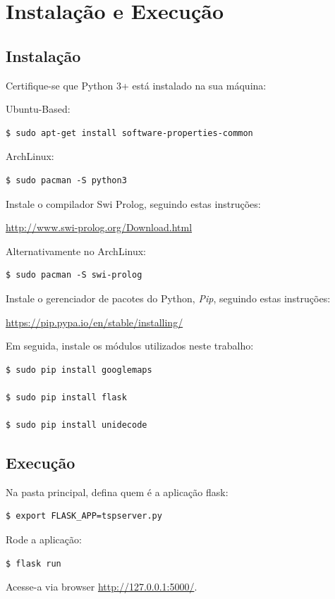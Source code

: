 \documentclass[12pt,a4paper]{article}
\begin{document}
\section{Instalação e Execução}
\subsection{Instalação}
Certifique-se que Python 3+ está instalado na sua máquina:

Ubuntu-Based:
\begin{verbatim}
$ sudo apt-get install software-properties-common 
\end{verbatim}

ArchLinux:
\begin{verbatim}
$ sudo pacman -S python3
\end{verbatim}

Instale o compilador Swi Prolog, seguindo estas instruções:

\url{http://www.swi-prolog.org/Download.html}

Alternativamente no ArchLinux:
\begin{verbatim}
$ sudo pacman -S swi-prolog
\end{verbatim}

Instale o gerenciador de pacotes do Python,  \emph{Pip}, seguindo estas instruções: 

\url{https://pip.pypa.io/en/stable/installing/}

Em seguida, instale os módulos utilizados neste trabalho:
\begin{verbatim}
$ sudo pip install googlemaps

$ sudo pip install flask

$ sudo pip install unidecode
\end{verbatim}
\subsection{Execução}

Na pasta principal, defina quem é a aplicação flask:
\begin{verbatim}
$ export FLASK_APP=tspserver.py
\end{verbatim}

Rode a aplicação:
\begin{verbatim}
$ flask run
\end{verbatim}

Acesse-a via browser \url{http://127.0.0.1:5000/}.
\end{document}
